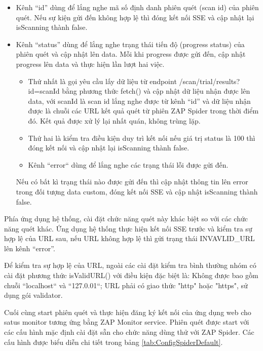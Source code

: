\begin{itemize}
  \item Kênh “id” dùng để lắng nghe mã số định danh phiên quét (scan id) của phiên quét.
  Nếu sự kiện gửi đến không hợp lệ thì đóng kết nối SSE và cập nhật lại isScanning thành false.
  \item Kênh “status” dùng để lắng nghe trạng thái tiến độ (progress status) của phiên quét và cập nhật lên data.
  Mỗi khi progress được gửi đến, cập nhật progress lên data và thực hiện lần lượt hai việc.
  \begin{itemize}
    \item Thứ nhất là gọi yêu cầu lấy dữ liệu từ endpoint /scan/trial/results?id=scanId bằng phương thức fetch() và cập nhật dữ liệu nhận được lên data, với scanId là scan id lắng nghe được từ kênh “id” và dữ liệu nhận được là chuỗi các URL kết quả quét từ phiên ZAP Spider trong thời điểm đó.
    Kết quả được xử lý lại nhất quán, không trùng lặp.
    \item Thứ hai là kiểm tra điều kiện duy trì kết nối nếu giá trị status là 100 thì đóng kết nối và cập nhật lại isScanning thành false.
    \item Kênh “error“ dùng để lắng nghe các trạng thái lỗi được gửi đến.
  \end{itemize}
  Nếu có bất kì trạng thái nào được gửi đến thì cập nhật thông tin lên error trong đối tượng data custom, đóng kết nối SSE và cập nhật isScanning thành false.
\end{itemize}

Phía ứng dụng hệ thống, cài đặt chức năng quét này khác biệt so với các chức năng quét khác.
Ứng dụng hệ thống thực hiện kết nối SSE trước và kiểm tra sự hợp lệ của URL sau, nếu URL không hợp lệ thì gửi trạng thái INVAVLID\_URL lên kênh “error”.

Để kiểm tra sự hợp lệ của URL, ngoài các cài đặt kiểm tra bình thường nhóm có cài đặt phương thức isValidURL() với điều kiện đặc biệt là: Không được bao gồm chuỗi “localhost“ và “127.0.01“; URL phải có giao thức "http" hoặc "https", sử dụng gói validator.

Cuối cùng start phiên quét và thực hiện đăng ký kết nối của ứng dụng web cho satus monitor tương ứng bằng ZAP Monitor service.
Phiên quét được start với các cấu hình mặc định cài đặt sẵn cho chức năng dùng thử với ZAP Spider.
Các cấu hình được biểu diễn chi tiết trong bảng \ref{tab:ConfigSpiderDefault}.

